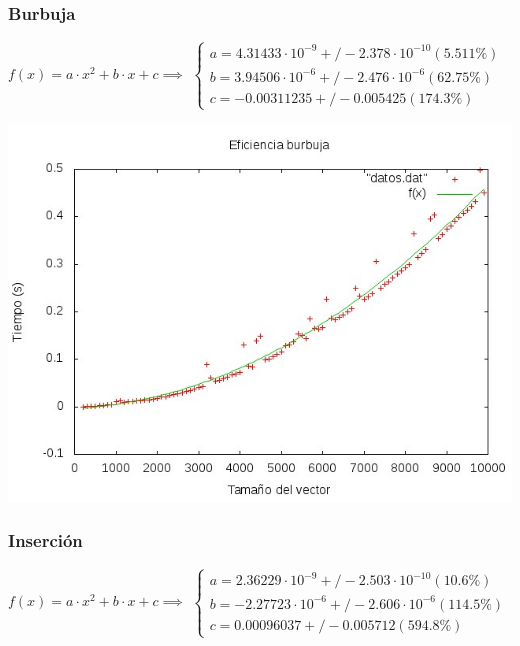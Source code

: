 \documentclass[11pt,spanish]{article} %
\begin{document}
\subsubsection{Burbuja}
$f(x) = a\cdot x^2 + b\cdot x + c \implies$
$\left\{ \begin{array}{c}
a               = 4.31433\cdot 10^{-9}      +/- 2.378\cdot 10^{-10}    (5.511\%) \\
b               = 3.94506\cdot 10^{-6}      +/- 2.476\cdot 10^{-6}    (62.75\%) \\
c               = -0.00311235      +/- 0.005425     (174.3\%)
\end{array}\right.$
\begin{center}
\includegraphics[scale=0.55]{../Graficas/Burbuja/burbujaO0_ruben.jpeg}
\end{center}

\subsubsection{Inserci\'on} %
$f(x) = a\cdot x^2 + b\cdot x + c \implies$
$\left\{ \begin{array}{c}
a               = 2.36229\cdot 10^{-9}      +/- 2.503\cdot 10^{-10}    (10.6\%) \\
b               = -2.27723\cdot 10^{-6}     +/- 2.606\cdot 10^{-6}    (114.5\%) \\
c               = 0.00096037       +/- 0.005712     (594.8\%)
\end{array}\right.$
\end{document}
